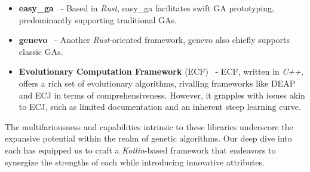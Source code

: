 \begin{itemize}
    \item \textbf{easy\_ga}~\autocite{EasyGaSrc} - 
      Based in \textit{Rust}, easy\_ga facilitates swift GA prototyping, 
      predominantly supporting traditional GAs.
    \item \textbf{genevo}~\autocite{GenevoRust} -
      Another \textit{Rust}-oriented framework, genevo also chiefly supports classic GAs.
    \item \textbf{Evolutionary Computation Framework} (ECF)~\autocite{djakobovicECFEvolutionaryComputation2023} - 
      ECF, written in \textit{C++}, offers a rich set of evolutionary 
      algorithms, rivalling frameworks like DEAP and ECJ in terms of 
      comprehensiveness.
      However, it grapples with issues akin to ECJ, such as limited 
      documentation and an inherent steep learning curve.
  \end{itemize}

  The multifariousness and capabilities intrinsic to these libraries underscore 
  the expansive potential within the realm of genetic algorithms.
  Our deep dive into each has equipped us to craft a \textit{Kotlin}-based 
  framework that endeavors to synergize the strengths of each while introducing 
  innovative attributes.
